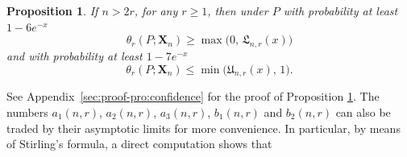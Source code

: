 \documentclass{article}
\newtheorem{proposition}{Proposition}
\newcommand{\1}{\boldsymbol{1}}
\theoremstyle{plain}
\begin{document}
\begin{proposition}
  \label{pro:7-confidence}
  If $n > 2r$, for any $r\geq1$, then under $P$ with probability at least $1 - 6e^{-x}$
  \begin{equation*}
    \theta_r(P;\mathbf{X}_n)%
    \geq \max\Big(0,\, \mathfrak{L}_{n,r}(x) \Big)
  \end{equation*}
  and with probability at least $1 - 7e^{-x}$
  \begin{equation*}
    \theta_r(P;\mathbf{X}_n)%
    \leq \min\Big(\mathfrak{U}_{n,r}(x),\, 1\Big).
  \end{equation*}
\end{proposition}

See Appendix~\ref{sec:proof-pro:confidence} for the proof of Proposition \ref{pro:7-confidence}. The numbers $a_1(n,r)$, $a_2(n,r)$, $a_3(n,r)$, $b_1(n,r)$ and $b_2(n,r)$ can also be traded by their asymptotic limits for more convenience. In particular, by means of Stirling's formula, a direct computation shows that
\end{document}
